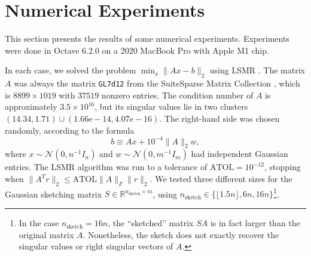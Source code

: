 \documentclass{article}
\newcommand{\ts}{^T}
\begin{document}
\section{Numerical Experiments} \label{sec:numerical_experiments}
This section presents the results of some numerical experiments. Experiments were done in Octave 6.2.0 on a 2020 MacBook Pro with Apple M1 chip. 

In each case, we solved the problem $\min_x \|Ax-b\|_2$ using LSMR \cite{fong2011lsmr}. The matrix $A$ was always the matrix \texttt{GL7d12} from the SuiteSparse Matrix Collection \cite{davis2011university, kolodziej2019suitesparse}, which is $8899\times 1019$ with $37519$ nonzero entries. The condition number of $A$ is approximately $3.5\times 10^{16}$, but its singular values lie in two clusters $(14.34,1.71)\cup (1.66\mathrm{e}-14,4.07\mathrm{e}-16)$. The right-hand side was chosen randomly, according to the formula
\begin{equation*}
    b \equiv Ax + 10^{-4}\|A\|_2 w,
\end{equation*}
where $x\sim \mathcal{N}(0,n^{-1}I_n)$ and $w\sim \mathcal{N}(0,m^{-1}I_m)$ had independent Gaussian entries. The LSMR algorithm was run to a tolerance of $\text{ATOL}=10^{-12}$, stopping when $\|A\ts r\|_2\leq \text{ATOL}\|A\|_F\|r\|_2$. We tested three different sizes for the Gaussian sketching matrix $S\in \mathbb{R}^{n_{\text{sketch}}\times m}$, using $n_{\text{sketch}}\in \{\lfloor1.5n\rfloor, 6n, 16n\}$\footnote{In the case $n_{\text{sketch}}=16n$, the ``sketched'' matrix $SA$ is in fact larger than the original matrix $A$. Nonetheless, the sketch does not exactly recover the singular values or right singular vectors of $A$.}.
\end{document}
